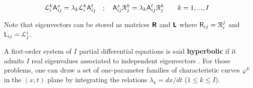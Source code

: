 \begin{equation}
  \label{eq:eigenvectors}
  \mathcal{L}^k_i  \mathsf{A}^x_{ij} = \lambda_k \mathcal{L}^k_i \mathsf{A}^t_{ij} \quad ; \quad \mathsf{A}^x_{ij}\mathcal{R}^k_j = \lambda_k \mathsf{A}^t_{ij}\mathcal{R}^k_j \qquad k=1,...,I
\end{equation}
\begin{remark}
  Note that eigenvectors can be stored as matrices $\boldsymbol{\mathsf{R}}$ and $\boldsymbol{\mathsf{L}}$ where $\mathsf{R}_{ij}=\mathcal{R}^j_i$ and $\mathsf{L}_{ij}=\mathcal{L}_j^i$.
\end{remark}

\begin{definition}
  \label{def:hyperbolic_system}
  A first-order system of $I$ partial differential equations is said \textbf{hyperbolic} if it admits $I$ real eigenvalues associated to independent eigenvectors \cite{Courant}.
For those problems, one can draw a set of one-parameter families of characteristic curves $\varphi^k$ in the $(x,t)$ plane by integrating the relations $\lambda_k=dx/dt$ ($1 \leq k \leq I$).
\end{definition}

